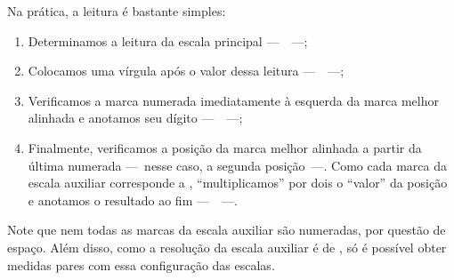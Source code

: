 \pagebreak
Na prática, a leitura é bastante simples: 
\begin{enumerate}
	\item Determinamos a leitura da escala principal ---~~---;
	\item Colocamos uma vírgula após o valor dessa leitura ---~~---;
	\item Verificamos a marca numerada imediatamente à esquerda da marca melhor alinhada e anotamos seu dígito ---~~---; 
	\item Finalmente, verificamos a posição da marca melhor alinhada a partir da última numerada ---~nesse caso, a segunda posição~---. Como cada marca da escala auxiliar corresponde a , ``multiplicamos'' por dois o ``valor'' da posição e anotamos o resultado ao fim ---~~---.
\end{enumerate}
%
Note que nem todas as marcas da escala auxiliar são numeradas, por questão de espaço. Além disso, como a resolução da escala auxiliar é de , só é possível obter medidas pares com essa configuração das escalas.

